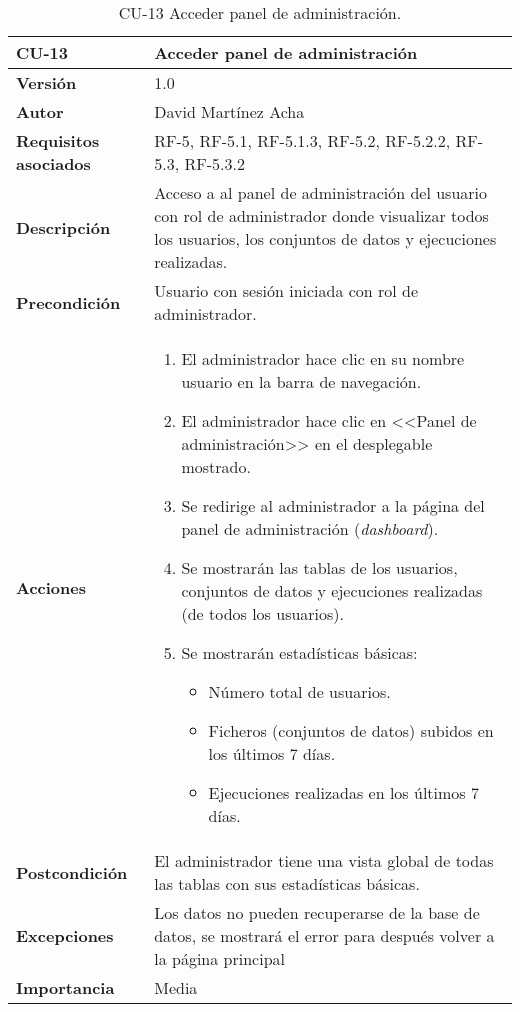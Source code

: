 \begin{table}[p]
	\centering
	\begin{tabularx}{\linewidth}{ p{} p{} }
		\toprule
		\textbf{CU-13}    & \textbf{Acceder panel de administración}\\
		\toprule
		\textbf{Versión}              & 1.0    \\
		\textbf{Autor}                & David Martínez Acha \\
		\textbf{Requisitos asociados} & RF-5, RF-5.1, RF-5.1.3, RF-5.2, RF-5.2.2, RF-5.3, RF-5.3.2\\
		\textbf{Descripción}          & Acceso a al panel de administración del usuario con rol de administrador donde visualizar 
		todos los usuarios, los conjuntos de datos y ejecuciones realizadas.\\
		\textbf{Precondición}         & Usuario con sesión iniciada con rol de administrador. \\
		\textbf{Acciones}             &
		\begin{enumerate}
			\def\labelenumi{\arabic{enumi}.}
			\tightlist
			\item El administrador hace clic en su nombre usuario en la barra de navegación.
			\item El administrador hace clic en <<Panel de administración>> en el desplegable mostrado.
			\item Se redirige al administrador a la página del panel de administración (\textit{dashboard}).
			\item Se mostrarán las tablas de los usuarios, conjuntos de datos y ejecuciones realizadas (de todos los usuarios).
			\item Se mostrarán estadísticas básicas:
			\begin{itemize}
				\item Número total de usuarios.
				\item Ficheros (conjuntos de datos) subidos en los últimos 7 días.
				\item Ejecuciones realizadas en los últimos 7 días.
			\end{itemize}
		\end{enumerate}\\
		\textbf{Postcondición}        & El administrador tiene una vista global de todas las tablas con sus estadísticas básicas.\\
		\textbf{Excepciones}          & Los datos no pueden recuperarse de la base de datos, se mostrará el error para después volver a la página principal\\
		\textbf{Importancia}          & Media \\
		\bottomrule
	\end{tabularx}
	\caption{CU-13 Acceder panel de administración.}
\end{table}

